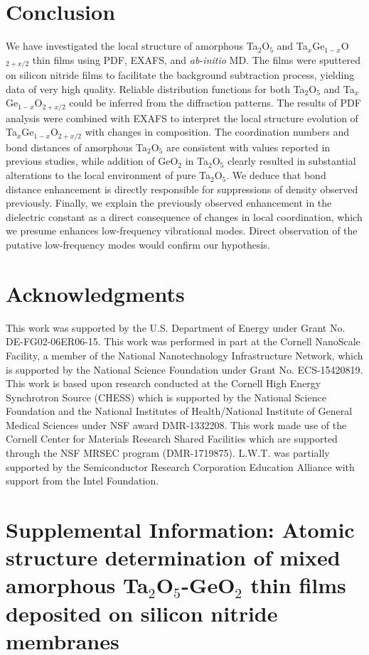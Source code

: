 \section{Conclusion}
We have investigated the local structure of amorphous Ta$_{2}$O$_{5}$ and Ta$_{x}$Ge$_{1-x}$O$_{2+x/2}$ thin films using PDF, EXAFS, and \emph{ab-initio} MD. The films were sputtered on silicon nitride films to facilitate the background subtraction process, yielding data of very high quality. Reliable distribution functions for both Ta$_{2}$O$_{5}$ and Ta$_{x}$Ge$_{1-x}$O$_{2+x/2}$ could be inferred from the diffraction patterns. The results of PDF analysis were combined with EXAFS to interpret the local structure evolution of Ta$_{x}$Ge$_{1-x}$O$_{2+x/2}$ with changes in composition. The coordination numbers and bond distances of amorphous Ta$_{2}$O$_{5}$ are consistent with values reported in previous studies, while addition of GeO$_{2}$ in Ta$_{2}$O$_{5}$ clearly resulted in substantial alterations to the local environment of pure Ta$_{2}$O$_{5}$. We deduce that bond distance enhancement is directly responsible for suppressions of density observed previously. Finally, we explain the previously observed enhancement in the dielectric constant as a direct consequence of changes in local coordination, which we presume enhances low-frequency vibrational modes. Direct observation of the putative low-frequency modes would confirm our hypothesis.

\section{Acknowledgments}
This work was supported by the U.S. Department of Energy under Grant No. DE-FG02-06ER06-15. This work was performed in part at the Cornell NanoScale Facility, a member of the National Nanotechnology Infrastructure Network, which is supported by the National Science Foundation under Grant No. ECS-15420819. This work is based upon research conducted at the Cornell High Energy Synchrotron Source (CHESS) which is supported by the National Science Foundation and the National Institutes of Health/National Institute of General Medical Sciences under NSF award DMR-1332208. This work made use of the Cornell Center for Materials Research Shared Facilities which are supported through the NSF MRSEC program (DMR-1719875). L.W.T. was partially supported by the Semiconductor Research Corporation Education Alliance with support from the Intel Foundation.

\section{Supplemental Information: Atomic structure determination of mixed amorphous Ta$_{2}$O$_{5}$-GeO$_{2}$ thin films deposited on silicon nitride membranes}

